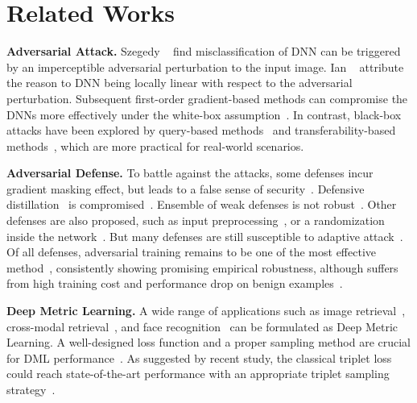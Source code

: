 \documentclass[10pt,twocolumn,letterpaper]{article}
\newcommand{\oo}[1]{\textcolor{orange}{#1}}
\begin{document}
\section{Related Works}
\label{sec:2}

\begin{comment}
\oo{In potential of future works}
Deep metric learning on adversarial example is also used for improving
adversarial robustness for deep classifiers~\cite{mao2019metric}.
\end{comment}

\textbf{Adversarial Attack.}
%
Szegedy \etal~\cite{l-bfgs} find misclassification of DNN can be triggered by
an imperceptible adversarial perturbation to the input image.
%
Ian \etal~\cite{fgsm} attribute the reason to DNN being locally linear with
respect to the adversarial perturbation.
%
Subsequent first-order gradient-based methods can compromise the DNNs more
effectively under the white-box assumption~\cite{i-fgsm,madry,apgd}.
%
In contrast, black-box attacks have been explored by query-based
methods~\cite{nes-atk,spsa-atk} and transferability-based
methods~\cite{di-fgsm}, which are more practical for real-world scenarios.

\textbf{Adversarial Defense.}
%
To battle against the attacks, some defenses incur gradient masking
effect, but leads to a false sense of security~\cite{obfuscated}.
%
Defensive distillation~\cite{distill2} is compromised~\cite{cw}.
%
Ensemble of weak defenses is not robust~\cite{ensembleweak}.
%
Other defenses are also proposed, such as input
preprocessing~\cite{deflecting}, or a randomization inside the
network~\cite{self-ensemble}.
%
But many defenses are still susceptible to adaptive attack~\cite{adaptive}.
%
Of all defenses, adversarial training remains to be one of the most effective
method~\cite{bilateral,advtrain-triplet,benchmarking}, consistently showing
promising empirical robustness, although suffers from high training
cost and performance drop on benign examples~\cite{odds}.

\textbf{Deep Metric Learning.}
%
A wide range of applications such as image retrieval~\cite{imagesim2},
cross-modal retrieval~\cite{ladderloss}, and face recognition~\cite{facenet}
can be formulated as Deep Metric Learning.
%
A well-designed loss function and a proper sampling method are crucial for DML
performance~\cite{dmlreality}.  As suggested by recent study, the classical
triplet loss could reach state-of-the-art performance with an appropriate
triplet sampling strategy~\cite{revisiting}.
\end{document}
